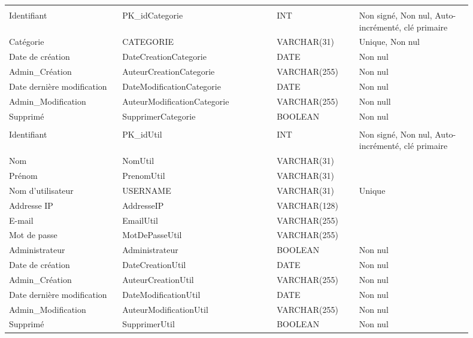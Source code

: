 \begin{center}
\begin{longtable}[c]{| m{0.22\linewidth}  m{0.3\linewidth}  m{0.16\linewidth}  m{0.22\linewidth} |}
					\rowcolor{mybrown}
					\multicolumn{4}{l}{tableCategories} \\
					Identifiant & PK\_idCategorie & INT & Non sign\'e, Non nul, Auto-incr\'ement\'e, cl\'e primaire\\
					Cat\'egorie & CATEGORIE & VARCHAR(31) & Unique, Non nul\\
					Date de cr\'eation & DateCreationCategorie & DATE & Non nul\\
					Admin\_Cr\'eation & AuteurCreationCategorie & VARCHAR(255) & Non nul\\
					Date derni\`ere modification & DateModificationCategorie & DATE & Non nul\\
					Admin\_Modification & AuteurModificationCategorie & VARCHAR(255) & Non null\\
					Supprim\'e & SupprimerCategorie & BOOLEAN & Non nul\\

					\rowcolor{mybrown}
					\multicolumn{4}{l}{tableUtilisateurs} \\
					Identifiant & PK\_idUtil & INT & Non sign\'e, Non nul, Auto-incr\'ement\'e, cl\'e primaire\\
					Nom & NomUtil & VARCHAR(31) &  \\
					Pr\'enom  & PrenomUtil & VARCHAR(31) & \\
					Nom d'utilisateur  & USERNAME & VARCHAR(31) & Unique\\
					Addresse IP  & AddresseIP & VARCHAR(128) & \\
					E-mail & EmailUtil & VARCHAR(255) & \\
					Mot de passe & MotDePasseUtil & VARCHAR(255) & \\
					Administrateur & Administrateur & BOOLEAN & Non nul\\
					Date de cr\'eation & DateCreationUtil & DATE & Non nul\\
					Admin\_Cr\'eation & AuteurCreationUtil & VARCHAR(255) & Non nul\\
					Date derni\`ere modification & DateModificationUtil & DATE & Non nul\\
					Admin\_Modification & AuteurModificationUtil & VARCHAR(255) & Non nul\\
					Supprim\'e & SupprimerUtil & BOOLEAN & Non nul\\


\end{longtable}
\end{center}
